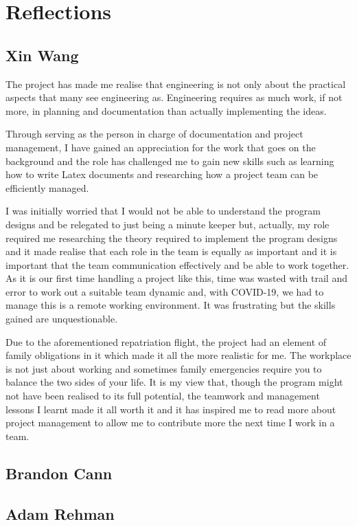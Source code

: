 \documentclass[12pt,a4paper]{article}
\begin{document}
\section{Reflections}
\subsection{Xin Wang}
The project has made me realise that engineering is not only about the practical aspects that many see engineering as.
Engineering requires as much work, if not more, in planning and documentation than actually implementing the ideas. 
\par
Through serving as the person in charge of documentation and project management, I have gained an appreciation for the 
work that goes on the background and the role has challenged me to gain new skills such as learning how to write 
Latex documents and researching how a project team can be efficiently managed. 
\par 
I was initially worried that I would not be able to understand the program designs and be relegated to just being a 
minute keeper but, actually, my role required me researching the theory required to implement the program designs and it made
realise that each role in the team is equally as important and it is important that the team communication effectively and 
be able to work together. As it is our first time handling a project like this, time was wasted with trail and error to work
out a suitable team dynamic and, with COVID-19, we had to manage this is a remote working environment. It was frustrating but
the skills gained are unquestionable.
\par 
Due to the aforementioned repatriation flight, the project had an element of family obligations in it which made it all the 
more realistic for me. The workplace is not just about working and sometimes family emergencies require you to balance the 
two sides of your life. It is my view that, though the program might not have been realised to its full potential, the 
teamwork and management lessons I learnt made it all worth it and it has inspired me to read more about project management to 
allow me to contribute more the next time I work in a team. 

\subsection{Brandon Cann}


\subsection{Adam Rehman}
\end{document}
